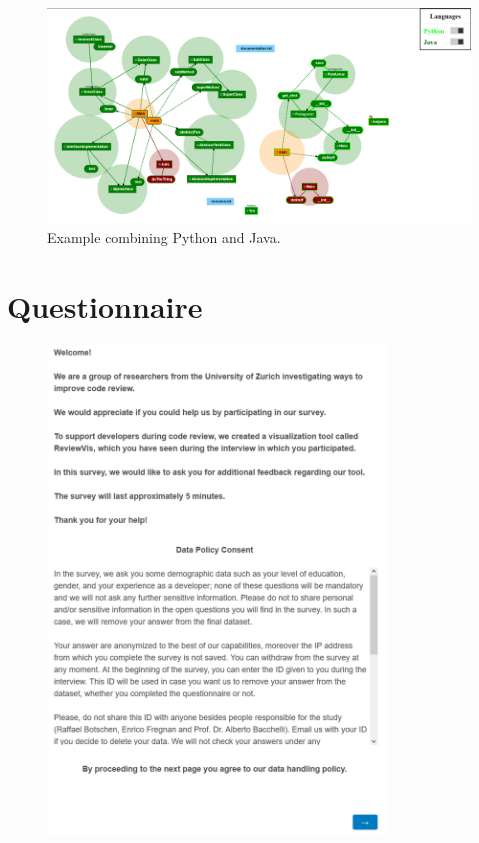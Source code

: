 \documentclass[a4paper,11pt,twoside]{article}
\theoremstyle{definition} %
\begin{document}
\newpage

\begin{figure}[h!]
    \centering
    \includegraphics[width=1.0\textwidth]{Subfigures/Appendices/Interview_Examples/example_combined.PNG}
    \caption{Example combining Python and Java.}
\end{figure}


\section{Questionnaire} \label{App:Questionnaire}

\begin{figure}[h]
    \centering
    \includegraphics[width=0.8\textwidth]{Subfigures/Appendices/Questionnaire/questionnaire_1.PNG}
\end{figure}
\end{document}
